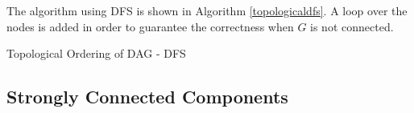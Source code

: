 The algorithm using DFS is shown in Algorithm \ref{topologicaldfs}. A loop over the nodes is added in order to guarantee the correctness when $G$ is not connected.
\begin{algorithm}[ht]
\caption{Topological Ordering of DAG - DFS}\label{topologicaldfs}
\begin{algorithmic}[1]
\Input{}
\Output{}
\EndIf
\EndFor
\EndFunction

\EndIf
\EndFor
{}
\EndFunction
\end{algorithmic}
\end{algorithm}
\subsection{Strongly Connected Components}
\ifx\PREAMBLE\undefined

\fi